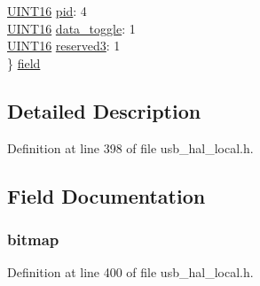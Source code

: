 \begin{DoxyCompactItemize}
\begin{tabbing}
\>\hyperlink{_generic_type_defs_8h_acfa284fa8026c4aace2728f7f15d6c13}{UINT16} \hyperlink{union_t_r_a_n_s_f_e_r___i_d___f_l_a_g_s_a8a7d7783c4c03b117abccbcddff1d5c8}{pid}: 4\\
\>\hyperlink{_generic_type_defs_8h_acfa284fa8026c4aace2728f7f15d6c13}{UINT16} \hyperlink{union_t_r_a_n_s_f_e_r___i_d___f_l_a_g_s_ab4284cbe5cfd86e9ef823c6a8ca2139b}{data\_toggle}: 1\\
\>\hyperlink{_generic_type_defs_8h_acfa284fa8026c4aace2728f7f15d6c13}{UINT16} \hyperlink{union_t_r_a_n_s_f_e_r___i_d___f_l_a_g_s_a6f7d2ef29d8750233d2702f45ce01c9d}{reserved3}: 1\\
\} \hyperlink{union_t_r_a_n_s_f_e_r___i_d___f_l_a_g_s_a15b99faa63877b225268e5930425b05a}{field}\\

\end{tabbing}\end{DoxyCompactItemize}


\subsection{Detailed Description}


Definition at line 398 of file usb\+\_\+hal\+\_\+local.\+h.



\subsection{Field Documentation}
\hypertarget{union_t_r_a_n_s_f_e_r___i_d___f_l_a_g_s_ac8565d3bec583a08b68ba70cccd8c523}{}
\subsubsection[{bitmap}]{ bitmap}\label{union_t_r_a_n_s_f_e_r___i_d___f_l_a_g_s_ac8565d3bec583a08b68ba70cccd8c523}


Definition at line 400 of file usb\+\_\+hal\+\_\+local.\+h.

\hypertarget{union_t_r_a_n_s_f_e_r___i_d___f_l_a_g_s_a8b4bf4f4e2fa0034e326d8407131dc8b}{}
